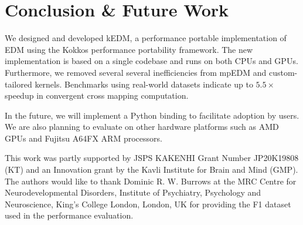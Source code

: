 \documentclass{acmart}
\begin{document}
\section{Conclusion \& Future Work}\label{sec:conclusion}

We designed and developed kEDM, a performance portable implementation of EDM
using the Kokkos performance portability framework. The new implementation
is based on a single codebase and runs on both CPUs and GPUs. Furthermore, we removed several
several inefficiencies from mpEDM and custom-tailored kernels. Benchmarks using real-world datasets indicate up to $5.5\times$
speedup in convergent cross mapping computation.

In the future, we will implement a Python binding to facilitate adoption by
users. We are also planning to evaluate on other hardware platforms such as AMD GPUs and Fujitsu A64FX ARM processors.

\begin{acks}
This work was partly supported by JSPS KAKENHI Grant Number JP20K19808 (KT) and an
Innovation grant by the Kavli Institute for Brain and Mind (GMP). The authors would like to thank Dominic R. W. Burrows at the MRC Centre for Neurodevelopmental Disorders, Institute of Psychiatry, Psychology and Neuroscience, King's College London, London, UK for providing the F1 dataset used in the performance evaluation.
\end{acks}



\end{document}
